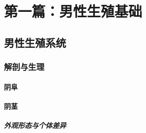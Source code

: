%
%

\newif\ifskipmaleframework
\skipmaleframeworktrue   %

\ifskipmaleframework
\else

\part{第一篇：男性生殖基础}

\chapter{男性生殖系统}

\section{解剖与生理}

\subsection{阴阜}

\subsection{阴茎}

\subsubsection{外观形态与个体差异}

